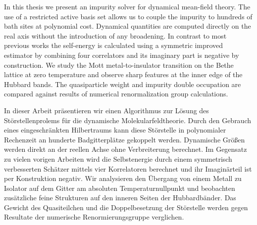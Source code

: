 

In this thesis we present an impurity solver for dynamical mean-field theory.
The use of a restricted active basis set allows us to couple the impurity to hundreds of bath sites
at polynomial cost.
Dynamical quantities are computed directly on the real axis
without the introduction of any broadening.
In contrast to most previous works the self-energy is calculated using
a symmetric improved estimator by combining four correlators
and its imaginary part is negative by construction.
We study the Mott metal-to-insulator transition on the Bethe lattice at zero temperature
and observe sharp features at the inner edge of the Hubbard bands.
The quasiparticle weight and impurity double occupation
are compared against results of numerical renormalization group calculations.



In dieser Arbeit präsentieren wir einen Algorithmus zur Lösung des 
Störstellenprolems für die dynamische Molekularfeldtheorie.
Durch den Gebrauch eines eingeschränkten Hilbertraums kann diese Störstelle in
polynomialer Rechenzeit an hunderte Badgitterplätze gekoppelt werden.
Dynamische Größen werden direkt an der reellen Achse ohne Verbreiterung berechnet.
Im Gegensatz zu vielen vorigen Arbeiten
wird die Selbstenergie durch einem symmetrisch verbesserten Schätzer
mittels vier Korrelatoren berechnet
und ihr Imaginärteil ist per Konstruktion negativ.
Wir analysieren den  Übergang von einem Metall zu Isolator
auf dem  Gitter am absoluten Temperaturnullpunkt
und beobachten zusätzliche feine Strukturen auf den inneren Seiten der Hubbardbänder.
Das Gewicht des Quasiteilchen und die Doppelbesetzung der Störstelle werden
gegen Resultate der numerische Renormierungsgruppe verglichen.


